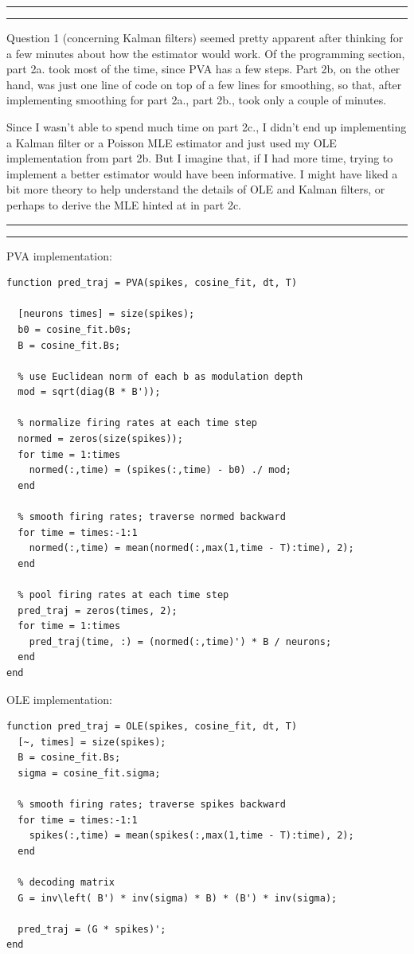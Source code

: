 \documentclass[11pt]{article}
\newcounter{questionCounter}
\newcounter{partCounter}[questionCounter]
\newenvironment{question}[2][\arabic{questionCounter}]{%
    \setcounter{partCounter}{0}%
    \vspace{.25in} \hrule \vspace{0.5em}%
        \noindent{\bf #2}%
    \vspace{0.8em} \hrule \vspace{.10in}%
    \addtocounter{questionCounter}{1}%
}{}
\begin{document}
\newpage
\begin{question}{Problem 3}
Question 1 (concerning Kalman filters) seemed pretty apparent after thinking
for a few minutes about how the estimator would work. Of the programming
section, part 2a. took most of the time, since PVA has a few steps. Part 2b,
on the other hand, was just one line of code on top of a few lines for
smoothing, so that, after implementing smoothing for part 2a., part 2b., took
only a couple of minutes.

Since I wasn't able to spend much time on part 2c., I didn't end up
implementing a Kalman filter or a Poisson MLE estimator and just used my OLE
implementation from part 2b. But I imagine that, if I had more time,
trying to implement a better estimator would have been informative.
I might have liked a bit more theory to help understand the details of OLE and
Kalman filters, or perhaps to derive the MLE hinted at in part 2c.
\end{question}
\newpage
\begin{question}{Code}
PVA implementation:
\begin{verbatim}
function pred_traj = PVA(spikes, cosine_fit, dt, T)

  [neurons times] = size(spikes);
  b0 = cosine_fit.b0s;
  B = cosine_fit.Bs;

  % use Euclidean norm of each b as modulation depth
  mod = sqrt(diag(B * B'));

  % normalize firing rates at each time step
  normed = zeros(size(spikes));
  for time = 1:times
    normed(:,time) = (spikes(:,time) - b0) ./ mod;
  end

  % smooth firing rates; traverse normed backward
  for time = times:-1:1
    normed(:,time) = mean(normed(:,max(1,time - T):time), 2);
  end

  % pool firing rates at each time step
  pred_traj = zeros(times, 2);
  for time = 1:times
    pred_traj(time, :) = (normed(:,time)') * B / neurons;
  end
end
\end{verbatim}

OLE implementation:
\begin{verbatim}
function pred_traj = OLE(spikes, cosine_fit, dt, T)
  [~, times] = size(spikes);
  B = cosine_fit.Bs;
  sigma = cosine_fit.sigma;

  % smooth firing rates; traverse spikes backward
  for time = times:-1:1
    spikes(:,time) = mean(spikes(:,max(1,time - T):time), 2);
  end

  % decoding matrix
  G = inv\left( B') * inv(sigma) * B) * (B') * inv(sigma);

  pred_traj = (G * spikes)';
end
\end{verbatim}
\end{question}
\end{document}
